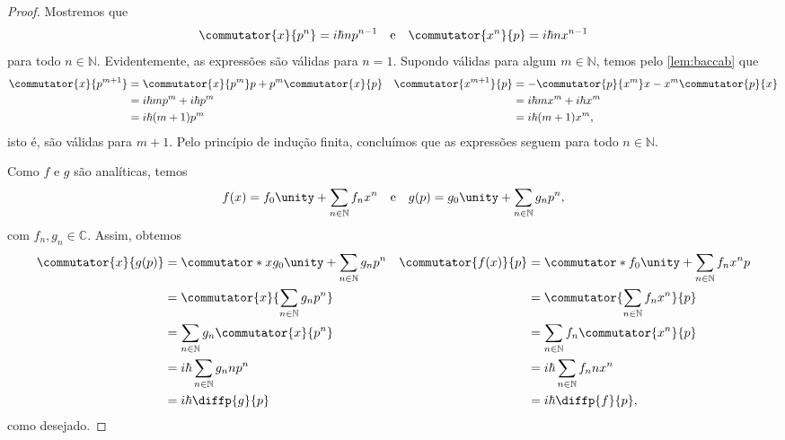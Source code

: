 \begin{proof}
    Mostremos que
    \begin{equation*}
        \commutator{x}{p^n} = i \hbar n p^{n - 1}
        \quad\text{e}\quad
        \commutator{x^n}{p} = i \hbar n x^{n-1}
    \end{equation*}
    para todo \(n \in \mathbb{N}\). Evidentemente, as expressões são válidas para \(n = 1\). Supondo válidas para algum \(m \in \mathbb{N}\), temos pelo \cref{lem:baccab} que
    \begin{align*}
        \commutator{x}{p^{m+1}} &= \commutator{x}{p^m}p + p^m\commutator{x}{p}&
        \commutator{x^{m+1}}{p} &= -\commutator{p}{x^m}x - x^m\commutator{p}{x}\\
                                &= i \hbar m p^m + i\hbar p^m&
                                &= i \hbar m x^m + i \hbar x^m\\
                                &= i \hbar (m+1) p^m&
                                &= i \hbar(m + 1) x^m,
    \end{align*}
    isto é, são válidas para \(m+1.\) Pelo princípio de indução finita, concluímos que as expressões seguem para todo \(n \in \mathbb{N}\).
    
    Como \(f\) e \(g\) são analíticas, temos
    \begin{equation*}
        f(x) = f_0 \unity + \sum_{n \in \mathbb{N}} f_n x^n
        \quad\text{e}\quad
        g(p) = g_0 \unity + \sum_{n \in \mathbb{N}} g_n p^n,
    \end{equation*}
    com \(f_n, g_n \in \mathbb{C}\). Assim, obtemos
    \begin{align*}
        \commutator{x}{g(p)} &= \commutator*{x}{g_0 \unity + \sum_{n \in \mathbb{N}} g_n p^n} &
        \commutator{f(x)}{p} &= \commutator*{f_0 \unity + \sum_{n \in \mathbb{N}} f_n x^n}{p}\\
                             &= \commutator{x}{\sum_{n \in \mathbb{N}} g_n p^n} &
                             &= \commutator{\sum_{n \in \mathbb{N}} f_n x^n}{p} \\
                             &= \sum_{n \in \mathbb{N}} g_n \commutator{x}{p^n} &
                             &= \sum_{n \in \mathbb{N}} f_n \commutator{x^n}{p} \\
                             &= i\hbar \sum_{n \in \mathbb{N}} g_n n p^n &
                             &= i\hbar \sum_{n \in \mathbb{N}} f_n n x^n \\
                             &= i \hbar \diffp{g}{p}&
                             &= i \hbar \diffp{f}{p},
    \end{align*}
    como desejado.
\end{proof}
